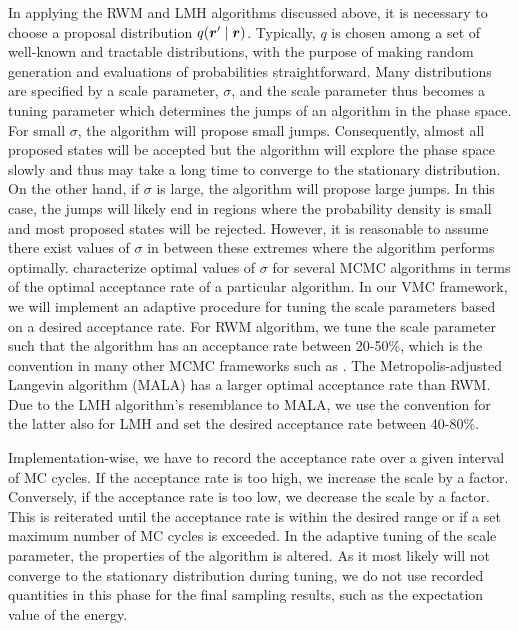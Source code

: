 In applying the RWM and LMH algorithms discussed above, it is necessary to choose a proposal distribution $q \qty(\bm{r}' \mid \bm{r})$. Typically, $q$ is chosen among a set of well-known and tractable distributions, with the purpose of making random generation and evaluations of probabilities straightforward. Many distributions are specified by a scale parameter, $\sigma$, and the scale parameter thus becomes a tuning parameter which determines the jumps of an algorithm in the phase space. For small $\sigma$, the algorithm will propose small jumps. Consequently, almost all proposed states will be accepted but the algorithm will explore the phase space slowly and thus may take a long time to converge to the stationary distribution. On the other hand, if $\sigma$ is large, the algorithm will propose large jumps. In this case, the jumps will likely end in regions where the probability density is small and most proposed states will be rejected. However, it is reasonable to assume there exist values of $\sigma$ in between these extremes where the algorithm performs optimally. \citep{optimal_scale} characterize optimal values of $\sigma$ for several MCMC algorithms in terms of the optimal acceptance rate of a particular algorithm. In our VMC framework, we will implement an adaptive procedure for tuning the scale parameters based on a desired acceptance rate. For RWM algorithm, we tune the scale parameter such that the algorithm has an acceptance rate between 20-50\%, which is the convention in many other MCMC frameworks such as  \citep{pymc}. The Metropolis-adjusted Langevin algorithm (MALA) \citep{MALA} has a larger optimal acceptance rate than RWM. Due to the LMH algorithm's resemblance to MALA, we use the convention for the latter also for LMH and set the desired acceptance rate between 40-80\%.

Implementation-wise, we have to record the acceptance rate over a given interval of MC cycles. If the acceptance rate is too high, we increase the scale by a factor. Conversely, if the acceptance rate is too low, we decrease the scale by a factor. This is reiterated until the acceptance rate is within the desired range or if a set maximum number of MC cycles is exceeded. In the adaptive tuning of the scale parameter, the properties of the algorithm is altered. As it most likely will not converge to the stationary distribution during tuning, we do not use recorded quantities in this phase for the final sampling results, such as the expectation value of the energy. 

